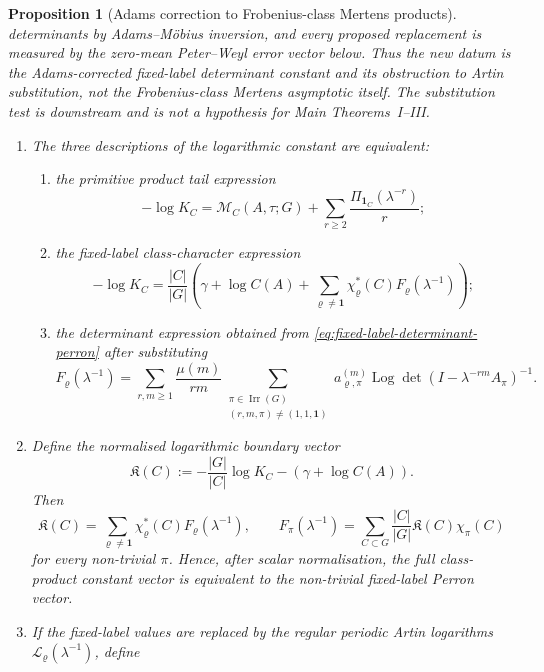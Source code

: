 \documentclass[11pt,a4paper]{amsart}
\theoremstyle{plain}
\newtheorem{proposition}[theorem]{Proposition}
\theoremstyle{definition}
\theoremstyle{remark}
\DeclareMathOperator{\Irr}{Irr}
\DeclareMathOperator{\Log}{Log}
\begin{document}
\begin{proposition}[Adams correction to Frobenius-class Mertens products]
  determinants by Adams--M\"obius inversion, and every proposed replacement is
  measured by the zero-mean Peter--Weyl error vector below.  Thus the new
  datum is the Adams-corrected fixed-label determinant constant and its
  obstruction to Artin substitution, not the Frobenius-class Mertens
  asymptotic itself.  The substitution test is downstream and is not a
  hypothesis for Main Theorems~I--III.
  \begin{enumerate}[label=\textup{(\Alph*)}]
    \item The three descriptions of the logarithmic constant are equivalent:
  \begin{enumerate}[label=\textup{(\roman*)}]
    \item the primitive product tail expression
    \[
      -\log K_C=
      \mathcal M_C(A,\tau;G)
      +\sum_{r\ge2}\frac{\Pi_{\mathbf1_C}(\lambda^{-r})}{r};
    \]
    \item the fixed-label class-character expression
    \[
      -\log K_C=
      \frac{|C|}{|G|}
      \left(
        \gamma+\log C(A)
        +\sum_{\varrho\neq\mathbf1}
          \chi_\varrho^\ast(C)F_\varrho(\lambda^{-1})
      \right);
    \]
    \item the determinant expression obtained from
    \eqref{eq:fixed-label-determinant-perron} after substituting
    \[
      F_\varrho(\lambda^{-1})
      =
      \sum_{r,m\ge1}\frac{\mu(m)}{rm}
        \sum_{\substack{\pi\in\Irr(G)\\(r,m,\pi)\ne(1,1,\mathbf1)}}
          a_{\varrho,\pi}^{(m)}
          \Log\det(I-\lambda^{-rm}A_\pi)^{-1}.
      \]
    \end{enumerate}
    \item Define the normalised logarithmic boundary vector
    \[
      \mathfrak K(C)
      :=-
      \frac{|G|}{|C|}\log K_C-(\gamma+\log C(A)).
    \]
    Then
    \begin{equation}\label{eq:comparison-fixed-label-inverse}
      \mathfrak K(C)=
      \sum_{\varrho\ne\mathbf1}
        \chi_\varrho^\ast(C)F_\varrho(\lambda^{-1}),
      \qquad
      F_\pi(\lambda^{-1})=
      \sum_{C\subset G}\frac{|C|}{|G|}\mathfrak K(C)\chi_\pi(C)
    \end{equation}
    for every non-trivial \(\pi\).  Hence, after scalar normalisation, the
    full class-product constant vector is equivalent to the non-trivial
    fixed-label Perron vector.
    \item If the fixed-label values are replaced by the regular periodic
    Artin logarithms \(\mathcal L_\varrho(\lambda^{-1})\), define

\end{enumerate}
\end{proposition}
\end{document}
